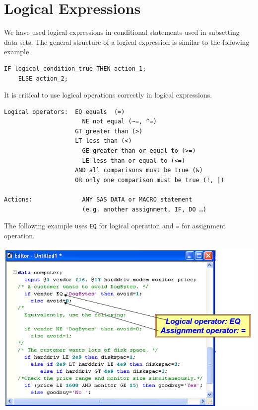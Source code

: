 \documentclass[
]{book}
\begin{document}
\hypertarget{logical-expressions}{%
\section{Logical Expressions}\label{logical-expressions}}

We have used logical expressions in conditional statements used in subsetting data sets. The general structure of a logical expression is similar to the following example.

\begin{verbatim}
IF logical_condition_true THEN action_1;
    ELSE action_2;
\end{verbatim}

It is critical to use logical operations correctly in logical expressions.

\begin{verbatim}
Logical operators:  EQ equals  (=)
                      NE not equal (~=, ^=)
                    GT greater than (>)
                    LT less than (<)
                      GE greater than or equal to (>=)
                      LE less than or equal to (<=)
                    AND all comparisons must be true (&)
                    OR only one comparison must be true (!, |)
                    
Actions:              ANY SAS DATA or MACRO statement 
                      (e.g. another assignment, IF, DO …)
\end{verbatim}

The following example uses \texttt{EQ} for logical operation and \texttt{=} for assignment operation.

\begin{center}\includegraphics[width=1\linewidth]{img09/w09-logicalAssignOperations} \end{center}
\end{document}

